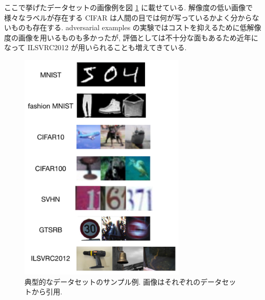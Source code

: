 ここで挙げたデータセットの画像例を図 \ref{fig:typical-dataset-samples} に載せている.
解像度の低い画像で様々なラベルが存在する CIFAR は人間の目では何が写っているかよく分からないものも存在する.
adversarial examples の実験ではコストを抑えるために低解像度の画像を用いるものも多かったが, 評価としては不十分な面もあるため近年になって ILSVRC2012 が用いられることも増えてきている.
%
\begin{figure}[htbp]
\begin{center}
\includegraphics[width=8.0cm]{figures/typical-dataset-samples.pdf}
\end{center}
\caption{
典型的なデータセットのサンプル例.
画像はそれぞれのデータセットから引用.
}
\label{fig:typical-dataset-samples}
\end{figure}
%
